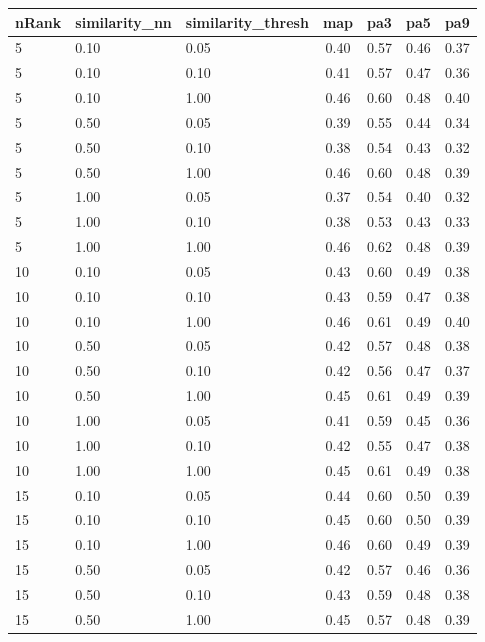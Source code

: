 \documentclass[12pt,a4paper,fleqn]{tufte-handout}
\begin{document}
 
\begin{table}        
\begin{center}        
\scriptsize        
\setlength{\tabcolsep}{.16667em}        
\begin{tabular}{lllcccc}        
nRank & similarity\_nn & similarity\_thresh & map & pa3 & pa5 & pa9 \\        
\hline        
5 & 0.10 & 0.05 & 0.40 & 0.57 & 0.46 & 0.37 \\        
5 & 0.10 & 0.10 & 0.41 & 0.57 & 0.47 & 0.36 \\        
5 & 0.10 & 1.00 & 0.46 & 0.60 & 0.48 & 0.40 \\        
5 & 0.50 & 0.05 & 0.39 & 0.55 & 0.44 & 0.34 \\        
5 & 0.50 & 0.10 & 0.38 & 0.54 & 0.43 & 0.32 \\        
5 & 0.50 & 1.00 & 0.46 & 0.60 & 0.48 & 0.39 \\        
5 & 1.00 & 0.05 & 0.37 & 0.54 & 0.40 & 0.32 \\        
5 & 1.00 & 0.10 & 0.38 & 0.53 & 0.43 & 0.33 \\        
5 & 1.00 & 1.00 & 0.46 & 0.62 & 0.48 & 0.39 \\        
10 & 0.10 & 0.05 & 0.43 & 0.60 & 0.49 & 0.38 \\        
10 & 0.10 & 0.10 & 0.43 & 0.59 & 0.47 & 0.38 \\        
10 & 0.10 & 1.00 & 0.46 & 0.61 & 0.49 & 0.40 \\        
10 & 0.50 & 0.05 & 0.42 & 0.57 & 0.48 & 0.38 \\        
10 & 0.50 & 0.10 & 0.42 & 0.56 & 0.47 & 0.37 \\        
10 & 0.50 & 1.00 & 0.45 & 0.61 & 0.49 & 0.39 \\        
10 & 1.00 & 0.05 & 0.41 & 0.59 & 0.45 & 0.36 \\        
10 & 1.00 & 0.10 & 0.42 & 0.55 & 0.47 & 0.38 \\        
10 & 1.00 & 1.00 & 0.45 & 0.61 & 0.49 & 0.38 \\        
15 & 0.10 & 0.05 & 0.44 & 0.60 & 0.50 & 0.39 \\        
15 & 0.10 & 0.10 & 0.45 & 0.60 & 0.50 & 0.39 \\        
15 & 0.10 & 1.00 & 0.46 & 0.60 & 0.49 & 0.39 \\        
15 & 0.50 & 0.05 & 0.42 & 0.57 & 0.46 & 0.36 \\        
15 & 0.50 & 0.10 & 0.43 & 0.59 & 0.48 & 0.38 \\        
15 & 0.50 & 1.00 & 0.45 & 0.57 & 0.48 & 0.39 \\        

\end{tabular}
\end{center}
\end{table}
\end{document}

